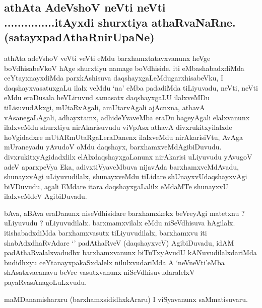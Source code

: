 \begin{center}

\section*{athAta AdeVshoV neVti neVti ...............itAyxdi shurxtiya athaRvaNaRne.(satayxpadAthaRnirUpaNe)}

\bigskip


\end{center}

\begin{artha}
athAta adeVshoV veVti veVti eMdu barxhamxtatavxvanunx heVge
boVdhisabeVkoV hAge shurxtiyu namage boVdhiside. iti eMbashabadxdiMda
ceYtayxnayxdiMda parxkAshisuva daqshayxgaLeMdugarxhisabeVku, I
daqshayxvasatuxgaLu ilalx veMdu `na' eMba padadiMda tiLiyuvadu, neVti,
neVti eMdu eraDusala heVLiruvud samasatx daqshayxgaLU ilalxveMDu
tiLisuvudAkxgi, mUtaRvAgali, amUtarvAgali ajAcnxna, athavA
vAsanegaLAgali, adhayxtamx, adhideYvaveMba eraDu bageyAgali
elalxvanunx ilalxveMdu shurxtiyu nirAkarisuvudu viVpAsx athavA
divxrukitxyilalxde hoVgidadxre mUtARmUtaRgaLeraDanenx ilalxveMdu
nirAkarisiVtu, AvAga mUraneyadu yAvudoV oMdu daqshayx,
barxhamxveMdAgibiDuvudu. divxrukitxyAgidadxlilx elAlxdaqshayxgaLanunx
nirAkarisi uLiyuvudu yAvugoV adeV aparxpeVya Eka, adivxtiVyaveMbuva
nijavAda barxhamxveMdAvadu, shunayxvAgi uLiyuvudilalx, shunayxveMdu
tiLidare shUnayxvUdaqshayxvAgi biVDuvudu, agali EMdare itara
daqshayxgaLalilx eMdaMTe shunayxvU ilalxveMdeV AgibiDuvadu.

bAva, aBAva eraDanunx niseVdhisidare barxhamxkekx beVreyAgi matetxnu ?
uLiyuvudu ? uLiyuvudilalx. barxmamxvilalx eMdu niSeVdhisuva
hAgilalx. itishabadxdiMda barxhamxvasutx tiLiyuvudilalx, barxhamxvu
iti shabAdxdhaRvAdare `\stext' padAthaRveV (daqshayxveV) AgibiDuvadu,
idAM padAthaRvalalxvadudhx barxhamxvanunx biTuTxyAvudU
kANuvudilalxdariMda budidhxyu ceYtanayxpakaSxdalelx nilulxvudariMda A
`neVneVti'eMba shAsatxvacanavu beVre vasutxvanunx
niSeVdhisuvudaralelxV payaRvasAnagoLuLxvudu.

maMDanamisharxru (barxhamxsididhxkAraru) I viSyavanunx
saMmatisuvaru. \stext 
\end{artha}

